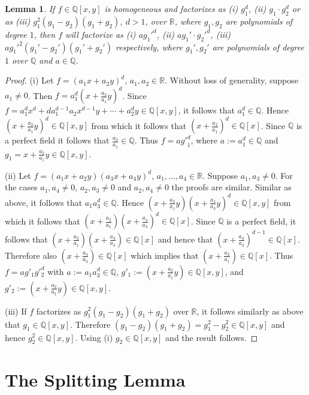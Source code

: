 \documentclass[noend]{amsproc}
\newtheorem{lemma}[theorem]{Lemma}
\begin{document}
\begin{lemma}\label{x^3}
If $f\in\mathbb Q[x,y]$ is homogeneous and factorizes as (i) $g_1^d$, (ii)
$g_1\cdot g_2^{d}$ or as  (iii) $g_1^2(g_1-g_2)(g_1+g_2)$, $d>1$, over
$\mathbb
R$, where $g_1,g_2$ are polynomials of degree $1$, then $f$ will factorize as
(i) $ag_1'^d$, (ii) $ag_1'\cdot g_2'^d$, (iii) $ag_1'^2(g_1'-g_2')(g_1'+g_2')$
respectively,
where $g_1', g_2'$ are polynomials of degree $1$ over $\mathbb Q$ and
$a\in\mathbb Q$.
\end{lemma}
\begin{proof}

(i) Let $f=(a_1x+a_2y)^d$, $a_1,a_2\in\mathbb R$. Without loss of generality,
suppose $a_1\neq 0$. Then $f=a_1^d(x+\frac{a_2}{a_1}y)^d$. Since $f=
a_1^dx^d+da_1^{d-1}a_2x^{d-1}y+\cdots+a_2^dy\in\mathbb Q[x,y]$, it follows
that $a_1^d\in\mathbb Q$. Hence $(x+\frac{a_2}{a_1}y)^d\in\mathbb Q[x,y]$
from which it follows that $(x+\frac{a_2}{a_1})^d\in\mathbb Q[x]$. Since
$\mathbb Q$ is a perfect field it follows that $\frac{a_2}{a_1}\in\mathbb
Q$. Thus $f=a{g'}_1^d$, where $a:=a_1^d\in\mathbb Q$ and
$g_1=x+\frac{a_2}{a_1}y\in\mathbb Q[x,y]$.

(ii) Let $f=(a_1x+a_2y)(a_3x+a_4y)^{d}$, $a_1,\ldots,a_4\in\mathbb
R$. Suppose $a_1,a_3\neq 0$.
For the cases $a_1,a_4\neq 0$, $a_2,a_3\neq 0$ and $a_2,a_4\neq 0$ the
proofs are similar.
Similar as above, it follows that $a_1a_3^{d}\in\mathbb Q$. Hence
$(x+\frac{a_2}{a_1}y)(x+\frac{a_4}{a_3}y)^d\in\mathbb Q[x,y]$ from which
it follows that $(x+\frac{a_2}{a_1})(x+\frac{a_4}{a_3})^d\in\mathbb
Q[x]$. Since $\mathbb Q$ is a perfect field, it follows that
$(x+\frac{a_2}{a_1})(x+\frac{a_4}{a_3})\in\mathbb Q[x]$ and
hence that $(x+\frac{a_4}{a_3})^{d-1}\in\mathbb Q[x]$. Therefore
also $(x+\frac{a_4}{a_3})\in\mathbb Q[x]$ which implies that
$(x+\frac{a_2}{a_1})\in\mathbb Q[x]$.
Thus $f=ag'_1g'^d_2$ with $a:=a_1a_3^d\in\mathbb Q$,
$g'_1:=(x+\frac{a_2}{a_1}y)\in\mathbb Q[x,y]$, and
$g'_2:=(x+\frac{a_2}{a_1}y)\in\mathbb Q[x,y]$.

(iii) If $f$ factorizes as $g_1^2(g_1-g_2)(g_1+g_2)$ over $\mathbb R$, it
follows similarly as above that $g_1\in\mathbb Q[x,y]$. Therefore
$(g_1-g_2)(g_1+g_2)=g_1^2-g_2^2\in\mathbb Q[x,y]$ and hence $g_2^2\in\mathbb
Q[x,y]$. Using (i) $g_2\in\mathbb Q[x,y]$ and the result follows.
\end{proof}


\section{The Splitting Lemma}\label{TheSplittingLemma}
\end{document}
